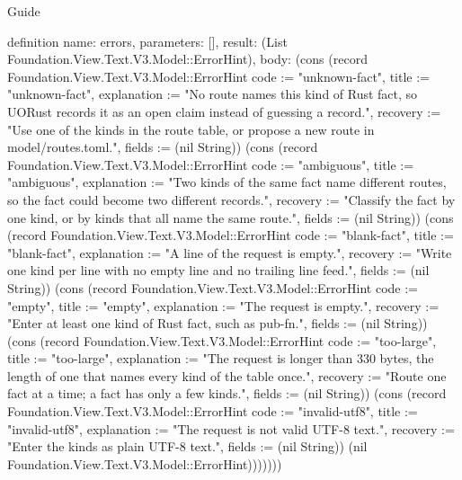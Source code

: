 \begin{lexlean}{Guide}
\begin{semanticmodule}
definition{
  name: errors,
  parameters: [],
  result: (List Foundation.View.Text.V3.Model::ErrorHint),
  body: (cons (record Foundation.View.Text.V3.Model::ErrorHint {code := "unknown-fact", title := "unknown-fact", explanation := "No route names this kind of Rust fact, so UORust records it as an open claim instead of guessing a record.", recovery := "Use one of the kinds in the route table, or propose a new route in model/routes.toml.", fields := (nil String)}) (cons (record Foundation.View.Text.V3.Model::ErrorHint {code := "ambiguous", title := "ambiguous", explanation := "Two kinds of the same fact name different routes, so the fact could become two different records.", recovery := "Classify the fact by one kind, or by kinds that all name the same route.", fields := (nil String)}) (cons (record Foundation.View.Text.V3.Model::ErrorHint {code := "blank-fact", title := "blank-fact", explanation := "A line of the request is empty.", recovery := "Write one kind per line with no empty line and no trailing line feed.", fields := (nil String)}) (cons (record Foundation.View.Text.V3.Model::ErrorHint {code := "empty", title := "empty", explanation := "The request is empty.", recovery := "Enter at least one kind of Rust fact, such as pub-fn.", fields := (nil String)}) (cons (record Foundation.View.Text.V3.Model::ErrorHint {code := "too-large", title := "too-large", explanation := "The request is longer than 330 bytes, the length of one that names every kind of the table once.", recovery := "Route one fact at a time; a fact has only a few kinds.", fields := (nil String)}) (cons (record Foundation.View.Text.V3.Model::ErrorHint {code := "invalid-utf8", title := "invalid-utf8", explanation := "The request is not valid UTF-8 text.", recovery := "Enter the kinds as plain UTF-8 text.", fields := (nil String)}) (nil Foundation.View.Text.V3.Model::ErrorHint)))))))
}


\end{semanticmodule}
\end{lexlean}

